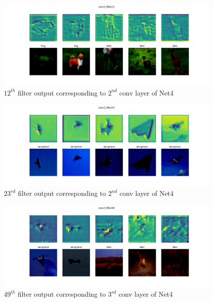 \documentclass{article}
\begin{document}
\begin{figure}[ht]
	\centering
	\includegraphics[scale=0.4]{../code/images/Filter_conv2_filter11.png}
	\caption{$12^{th}$ filter output corresponding to $2^{nd}$ conv layer of Net4}
	\label{fig:c2f11}
\end{figure}

\begin{figure}[ht]
	\centering
	\includegraphics[scale=0.4]{../code/images/Filter_conv2_filter23.png}
	\caption{$23^{rd}$ filter output corresponding to $2^{nd}$ conv layer of Net4}
	\label{fig:c2f23}
\end{figure}

\begin{figure}[ht]
	\centering
	\includegraphics[scale=0.4]{../code/images/Filter_conv3_filter49.png}
	\caption{$49^{th}$ filter output corresponding to $3^{rd}$ conv layer of Net4}
	\label{fig:c3f49}
\end{figure}
\end{document}
